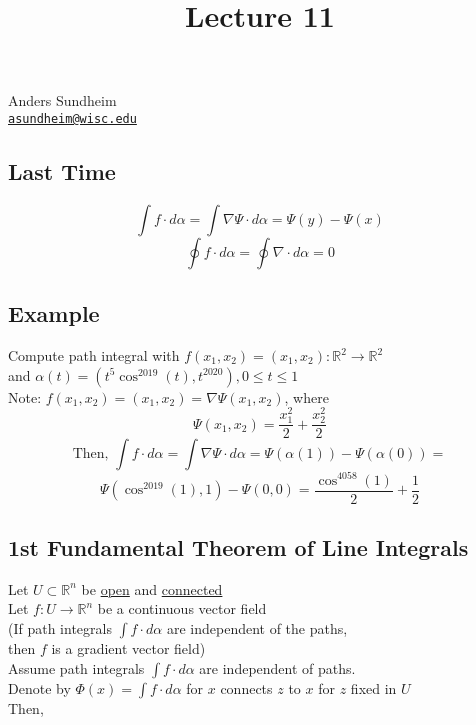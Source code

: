 \documentclass[12pt]{article}
\title{Lecture 11}
\newcommand{\BR}{\mathbb R}
\begin{document}
\maketitle
\vspace*{-0.25in}
\begin{center}
	Anders Sundheim \\
	\href{mailto:asundheim@wisc.edu}{{\tt asundheim@wisc.edu}}
\end{center}
\subsection*{Last Time}
  \[ \int f\cdot d\alpha=\int\nabla\Psi\cdot d\alpha=\Psi(y)-\Psi(x) \]
  \[ \oint f\cdot d\alpha=\oint\nabla\cdot d\alpha=0 \]
\subsection*{Example}
  Compute path integral with $f(x_1,x_2)=(x_1,x_2):\BR^2\rightarrow\BR^2$ \\
  and $\alpha(t)=(t^5\cos^{2019}(t),t^{2020}),0\leq t\leq 1$ \\
  Note: $f(x_1,x_2)=(x_1,x_2)=\nabla\Psi(x_1,x_2)$, where \\
  \[ \Psi(x_1,x_2)=\frac{x_1^2}{2}+\frac{x_2^2}{2} \]
  \[ \text{Then, }\int f\cdot d\alpha=\int\nabla\Psi\cdot d\alpha=\Psi(\alpha(1))-\Psi(\alpha(0)) = \]
  \[ \Psi(\cos^{2019}(1),1)-\Psi(0,0)=\frac{\cos^{4058}(1)}{2}+\frac{1}{2} \]
\subsection*{1st Fundamental Theorem of Line Integrals}
  Let $U\subset\BR^n$ be \underline{open} and \underline{connected} \\
  Let $f:U\rightarrow\BR^n$ be a continuous vector field \\
  (If path integrals $\int f\cdot d\alpha$ are independent of the paths, \\
  then $f$ is a gradient vector field) \\
  Assume path integrals $\int f\cdot d\alpha$ are independent of paths. \\
  Denote by $\Phi(x)=\int f\cdot d\alpha$ for $x$ connects $z$ to $x$ for $z$ fixed in $U$ \\
  Then,  \\
\end{document}
